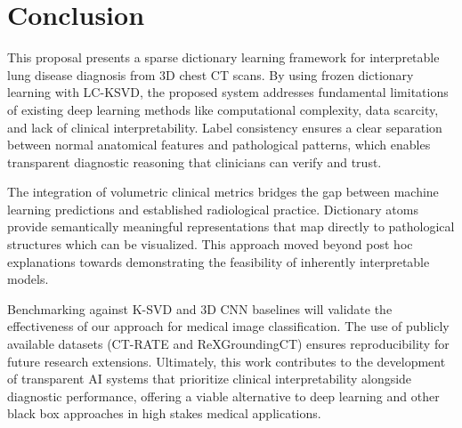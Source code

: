 \chapter{Conclusion}
This proposal presents a sparse dictionary learning framework for interpretable lung disease diagnosis from 3D chest CT scans.
By using frozen dictionary learning with LC-KSVD, the proposed system addresses fundamental limitations of existing deep
learning methods like computational complexity, data scarcity, and lack of clinical interpretability. Label consistency
ensures a clear separation between normal anatomical features and pathological patterns, which enables transparent diagnostic
reasoning that clinicians can verify and trust.

The integration of volumetric clinical metrics bridges the gap between machine learning predictions and established radiological
practice. Dictionary atoms provide semantically meaningful representations
that map directly to pathological structures which can be visualized. This approach moved beyond post hoc explanations
towards demonstrating the feasibility of inherently interpretable models.

Benchmarking against K-SVD and 3D CNN baselines will validate the effectiveness of our approach for medical
image classification. The use of publicly available datasets (CT-RATE and ReXGroundingCT) ensures reproducibility for
future research extensions.
Ultimately, this work contributes to the development of transparent AI systems that prioritize clinical interpretability alongside
diagnostic performance, offering a viable alternative to deep learning and other black box approaches in high stakes medical applications.